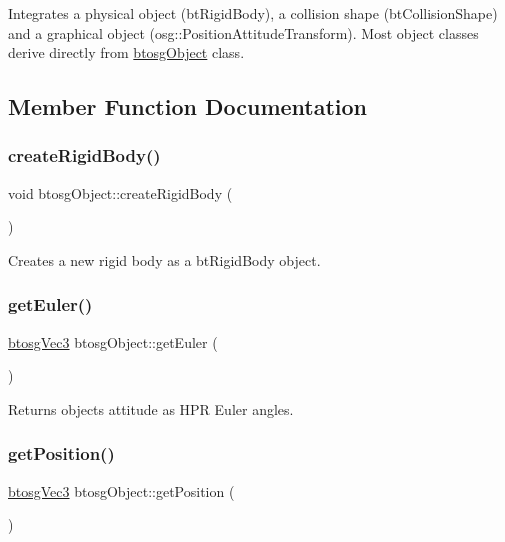 Integrates a physical object (bt\+Rigid\+Body), a collision shape (bt\+Collision\+Shape) and a graphical object (osg\+::\+Position\+Attitude\+Transform). Most object classes derive directly from \mbox{\hyperlink{classbtosgObject}{btosg\+Object}} class. 

\subsection{Member Function Documentation}
\mbox{\label{classbtosgObject_a029dbe9134fa94e7355799f67fb2cd6d}} 
\subsubsection{\texorpdfstring{createRigidBody()}{createRigidBody()}}
{\footnotesize\ttfamily void btosg\+Object\+::create\+Rigid\+Body (\begin{DoxyParamCaption}{ }\end{DoxyParamCaption})}

Creates a new rigid body as a bt\+Rigid\+Body object. \mbox{\label{classbtosgObject_a2019ec63bde02b72600450c7c985e77a}} 
\subsubsection{\texorpdfstring{getEuler()}{getEuler()}}
{\footnotesize\ttfamily \mbox{\hyperlink{classbtosgVec3}{btosg\+Vec3}} btosg\+Object\+::get\+Euler (\begin{DoxyParamCaption}{ }\end{DoxyParamCaption})\hspace{0.3cm}{\ttfamily [inline]}}

Returns object\textquotesingle{}s attitude as H\+PR Euler angles. \mbox{\label{classbtosgObject_a3dadd5da8f2a312e44a039446b93d4cd}} 
\subsubsection{\texorpdfstring{getPosition()}{getPosition()}}
{\footnotesize\ttfamily \mbox{\hyperlink{classbtosgVec3}{btosg\+Vec3}} btosg\+Object\+::get\+Position (\begin{DoxyParamCaption}{ }\end{DoxyParamCaption})\hspace{0.3cm}{\ttfamily [inline]}}

